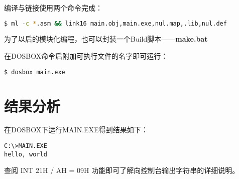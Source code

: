 编译与链接使用两个命令完成：

\begin{lstlisting}[language=bash,caption=汇编项目Build脚本——make.bat]
$ ml -c *.asm && link16 main.obj,main.exe,nul.map,.lib,nul.def
\end{lstlisting}

为了以后的模块化编程，也可以封装一个Build脚本——\textbf{make.bat}

在DOSBOX命令后附加可执行文件的名字即可运行：

\lstinline{$ dosbox main.exe}

\section{结果分析}

在DOSBOX下运行MAIN.EXE得到结果如下：

\begin{lstlisting}
C:\>MAIN.EXE
hello, world
\end{lstlisting}

查阅 INT 21H / AH = 09H 功能即可了解向控制台输出字符串的详细说明。